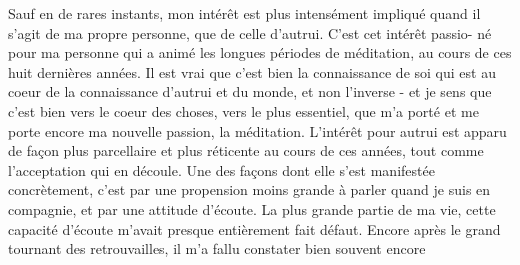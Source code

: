 Sauf en de rares instants, mon intérêt est plus intensément impliqué quand
il s'agit de ma propre personne, que de celle d'autrui. C'est cet intérêt passio-\linebreak
né pour ma personne qui a animé les longues périodes de méditation, au cours
de ces huit dernières années. Il est vrai que c'est bien la connaissance de soi
qui est au coeur de la connaissance d'autrui et du monde, et non l'inverse - et
je sens que c'est bien vers le coeur des choses, vers le plus essentiel, que
m'a porté et me porte encore ma nouvelle passion, la méditation. L'intérêt pour
autrui est apparu de façon plus parcellaire et plus réticente au cours de ces
années, tout comme l'acceptation qui en découle. Une des façons dont elle s'est
manifestée concrètement, c'est par une propension moins grande à parler quand je
suis en compagnie, et par une attitude d'écoute. La plus grande partie de ma vie,
cette capacité d'écoute m'avait presque entièrement fait défaut. Encore après
le grand tournant des retrouvailles, il m'a fallu constater bien souvent encore
\margin{\unsure{-}}
